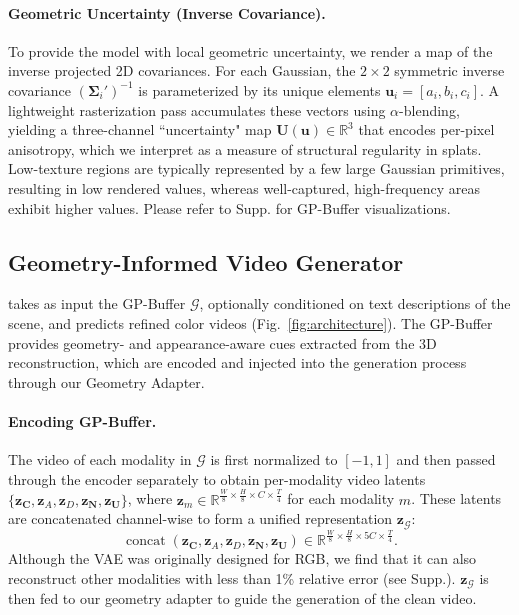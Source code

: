 \paragraph{Geometric Uncertainty (Inverse Covariance).}
To provide the model with local geometric uncertainty, we render a map of the inverse projected 2D covariances. 
For each Gaussian, the $2\times2$ symmetric inverse covariance $(\mathbf{\Sigma}_i')^{-1}$ is parameterized by its unique elements 
$\mathbf{u}_i = [a_i, b_i, c_i]$. 
A lightweight rasterization pass accumulates these vectors using $\alpha$-blending, yielding a three-channel ``uncertainty" map 
$\mathbf{U}(\mathbf{u}) \in \mathbb{R}^3$ that encodes per-pixel anisotropy, which we interpret as a measure of structural regularity in splats. 
Low-texture regions are typically represented by a few large Gaussian primitives, resulting in low rendered values, whereas well-captured, high-frequency areas exhibit higher values. Please refer to Supp. for GP-Buffer visualizations.




\subsection{Geometry-Informed Video Generator}
\label{sec:geometry_adapter}
\ours takes as input the GP-Buffer $\mathcal{G}$, optionally conditioned on text descriptions of the scene, and predicts refined color videos (Fig.~\ref{fig:architecture}).
The GP-Buffer provides geometry- and appearance-aware cues extracted from the 3D reconstruction, which are encoded and injected into the generation process through our Geometry Adapter.

\paragraph{Encoding GP-Buffer.}
The video of each modality in $\mathcal{G}$ is first normalized to $[-1, 1]$ and then passed through the encoder separately to obtain per-modality video latents  
$\{\mathbf{z}_{\mathbf{C}}, \mathbf{z}_{A}, \mathbf{z}_{D}, \mathbf{z}_{\mathbf{N}}, \mathbf{z}_{\mathbf{U}}\}$,  
where $\mathbf{z}_{m} \in \mathbb{R}^{\frac{W}{8} \times \frac{H}{8} \times C \times \frac{T}{4}}$ for each modality $m$.  
These latents are concatenated channel-wise to form a unified representation $\mathbf{z}_{\mathcal{G}}:$
\begin{equation}
    \operatorname{concat}(\mathbf{z}_{\mathbf{C}}, \mathbf{z}_{A}, \mathbf{z}_{D}, \mathbf{z}_{\mathbf{N}}, \mathbf{z}_{\mathbf{U}}) 
    \in \mathbb{R}^{\frac{W}{8} \times \frac{H}{8} \times 5C \times \frac{T}{4}}.
\end{equation}
Although the VAE was originally designed for RGB, we find that it can also reconstruct other modalities with less than 1\% relative error (see Supp.). $\mathbf{z}_{\mathcal{G}}$ is then fed to our geometry adapter to guide the generation of the clean video. 


